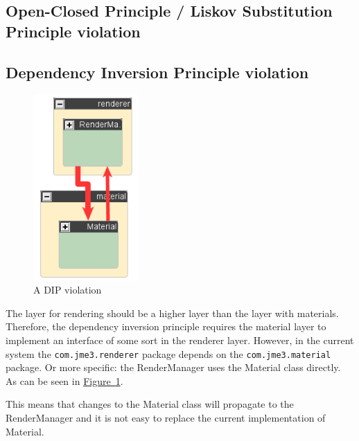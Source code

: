 \documentclass[a4paper, 10pt]{article}
\begin{document}
\subsection{Open-Closed Principle / Liskov Substitution Principle violation}
\label{sec:lsp_violation} %


\subsection{Dependency Inversion Principle violation}
\label{sec:dip_violation}
\begin{figure}
\includegraphics[width=40mm]{figures/dip-violation.png}
\vspace{-15pt}
\caption{A DIP violation}
\label{fig:dip-violation}
\vspace{-60pt}
\end{figure}

The layer for rendering should be a higher layer than the
layer with materials.
Therefore, the dependency inversion principle requires
the material layer to implement an interface of some sort
in the renderer layer.
However, in the current system the \verb|com.jme3.renderer| package 
depends on the \verb|com.jme3.material| package.
Or more specific: the RenderManager uses the Material class directly.
As can be seen in 
\hyperref[fig:dip-violation]{Figure~\ref*{fig:dip-violation}}.

This means that changes to the Material class will propagate
to the RenderManager and it is not easy to replace the current
implementation of Material.

\vspace{45pt}
\end{document}
